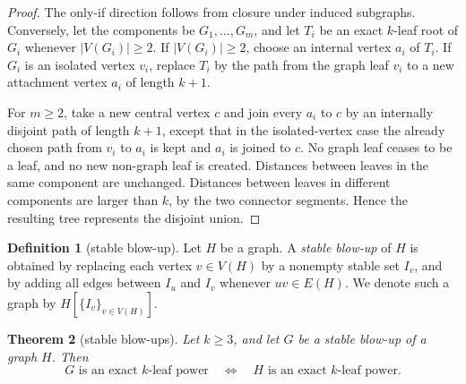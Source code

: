 \documentclass[11pt]{article}
\newtheorem{theorem}{Theorem}[section]
\theoremstyle{definition}
\newtheorem{definition}[theorem]{Definition}
\begin{document}
\begin{proof}
The only-if direction follows from closure under induced subgraphs.  Conversely, let the components be $G_1,\ldots,G_m$, and let $T_i$ be an exact $k$-leaf root of $G_i$ whenever $|V(G_i)|\ge2$.  If $|V(G_i)|\ge2$, choose an internal vertex $a_i$ of $T_i$.  If $G_i$ is an isolated vertex $v_i$, replace $T_i$ by the path from the graph leaf $v_i$ to a new attachment vertex $a_i$ of length $k+1$.

For $m\ge2$, take a new central vertex $c$ and join every $a_i$ to $c$ by an internally disjoint path of length $k+1$, except that in the isolated-vertex case the already chosen path from $v_i$ to $a_i$ is kept and $a_i$ is joined to $c$.  No graph leaf ceases to be a leaf, and no new non-graph leaf is created.  Distances between leaves in the same component are unchanged.  Distances between leaves in different components are larger than $k$, by the two connector segments.  Hence the resulting tree represents the disjoint union.
\end{proof}

\begin{definition}[stable blow-up]\label{def:stable-blowup}
Let $H$ be a graph.  A \emph{stable blow-up} of $H$ is obtained by replacing each vertex $v\in V(H)$ by a nonempty stable set $I_v$, and by adding all edges between $I_u$ and $I_v$ whenever $uv\in E(H)$.  We denote such a graph by $H[\{I_v\}_{v\in V(H)}]$.
\end{definition}

\begin{theorem}[stable blow-ups]\label{thm:stable-blow-up}
Let $k\ge3$, and let $G$ be a stable blow-up of a graph $H$.  Then
\[
 G\text{ is an exact }k\text{-leaf power}
 \quad\Longleftrightarrow\quad
 H\text{ is an exact }k\text{-leaf power}.
\]
\end{theorem}
\end{document}
